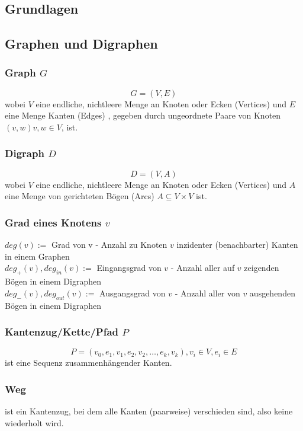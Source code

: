 \documentclass[10pt,a4paper,landscape]{article}
\begin{document}
	\begin{multicols*}{2}
        \normalsize

        
        \section{ Grundlagen }
            \subsection{ Graphen und Digraphen }
            
            \subsubsection*{ Graph $G$ }
            \[ G = (V,E) \]
            wobei $V$ eine endliche, nichtleere Menge an Knoten oder Ecken (Vertices) und $E$ eine Menge Kanten (Edges) 
            , gegeben durch ungeordnete Paare von Knoten $(v,w) v, w \in V$, ist.
            
            \subsubsection*{ Digraph $D$ }
            \[ D = (V,A)\]
            wobei $V$ eine endliche, nichtleere Menge an Knoten oder Ecken (Vertices) und $A$ eine Menge von gerichteten 
            Bögen (Arcs) $A \subseteq V \times V$ ist.

            \subsubsection*{ Grad eines Knotens $v$ }
            $deg(v) :=$ Grad von v - Anzahl zu Knoten $v$ inzidenter (benachbarter) Kanten in einem Graphen \\
            $deg_{+}(v), deg_{in}(v) :=$ Eingangsgrad von $v$ - Anzahl aller auf $v$ zeigenden Bögen in einem Digraphen \\
            $deg_{-}(v), deg_{out}(v) :=$ Ausgangsgrad von $v$ - Anzahl aller von $v$ ausgehenden Bögen in einem Digraphen 

            \subsubsection*{ Kantenzug/Kette/Pfad $P$ }
            \[ P = (v_0, e_1, v_1, e_2, v_2, \dots, e_k, v_k), v_i \in V, e_i \in E \]
            ist eine Sequenz zusammenhängender Kanten. 
            \subsubsection*{ Weg } ist ein Kantenzug, bei dem alle Kanten (paarweise) verschieden sind, also keine wiederholt wird.

\end{multicols*}
\end{document}

